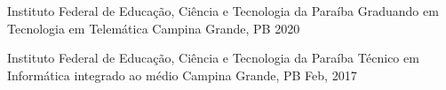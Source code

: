 
\begin{cventries}
  \cventry
    {Instituto Federal de Educação, Ciência e Tecnologia da Paraíba} %
    {Graduando em Tecnologia em Telemática} %
    {Campina Grande, PB} %
    {2020} %
    {}

  \cventry
    {Instituto Federal de Educação, Ciência e Tecnologia da Paraíba} %
    {Técnico em Informática integrado ao médio}
    {Campina Grande, PB}
    {Feb, 2017}
    {}
\end{cventries}
